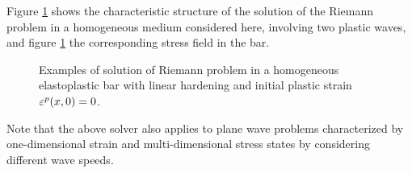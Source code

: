  Figure \ref{fig:EP_bar_solution} shows the characteristic structure of the solution of the Riemann problem in a homogeneous medium considered here, involving two plastic waves, and figure \ref{fig:EP_bar_solution} the corresponding stress field in the bar.

\begin{figure}[h!]
  \centering
  \caption{Examples of solution of Riemann problem in a homogeneous elastoplastic bar with linear hardening and initial plastic strain $\varepsilon^p(x,0)= 0$.}
  \label{fig:EP_bar_solution}
\end{figure}
\begin{remark}
  Note that the above solver also applies to plane wave problems characterized by one-dimensional strain and multi-dimensional stress states by considering different wave speeds.
\end{remark}


